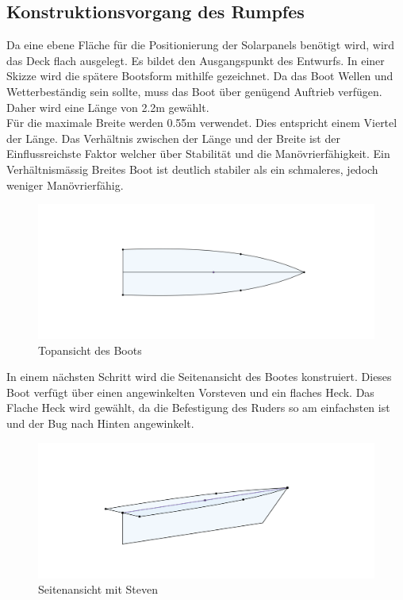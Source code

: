 {\subsection{Konstruktionsvorgang des Rumpfes}
Da eine ebene Fläche für die Positionierung der Solarpanels benötigt wird, wird das Deck flach ausgelegt. Es bildet den Ausgangspunkt des Entwurfs. In einer Skizze wird die spätere Bootsform mithilfe gezeichnet. Da das Boot Wellen und Wetterbeständig sein sollte, muss das Boot über genügend Auftrieb verfügen. Daher wird eine Länge von 2.2m gewählt. \\
Für die maximale Breite werden 0.55m verwendet. Dies entspricht einem Viertel der Länge. Das Verhältnis zwischen der Länge und der Breite ist der Einflussreichste Faktor welcher über  Stabilität und die Manövrierfähigkeit. Ein Verhältnismässig Breites Boot ist deutlich stabiler als ein schmaleres, jedoch weniger Manövrierfähig. \cite{Seemannschaft} \\
\begin{figure}[H]
    \centering
    \includegraphics[width=1\linewidth]{assets/boot sketch top.png}
    \caption{Topansicht des Boots}
   
\end{figure}
In einem nächsten Schritt wird die Seitenansicht des Bootes konstruiert. Dieses Boot verfügt über einen angewinkelten Vorsteven und ein flaches Heck. Das Flache Heck wird gewählt, da die Befestigung des Ruders so am einfachsten ist und der Bug nach Hinten angewinkelt.

\begin{figure}[H]
    \centering
    \includegraphics[width=1\linewidth]{assets/boot_skizze_2.png}
    \caption{Seitenansicht mit Steven}
    

\end{figure}}
